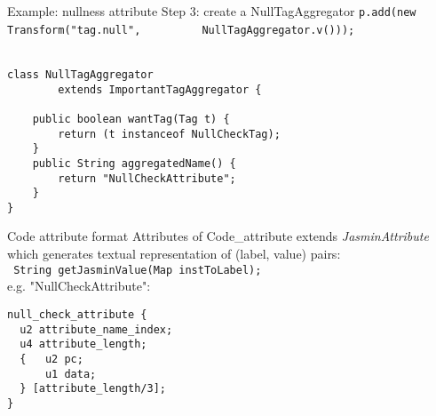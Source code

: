 \begin{slide}{Example: nullness attribute}
Step 3: create a NullTagAggregator
{\scriptsize\verb$p.add(new Transform("tag.null",$
   \verb$         NullTagAggregator.v())); $}
\ \\
\ \\
{\scriptsize
\begin{verbatim}
class NullTagAggregator
        extends ImportantTagAggregator {

    public boolean wantTag(Tag t) {
        return (t instanceof NullCheckTag);
    }
    public String aggregatedName() {
        return "NullCheckAttribute"; 
    }
}
\end{verbatim}
}
\end{slide}

\begin{slide}{Code attribute format}
Attributes of Code\_attribute extends {\em JasminAttribute}
which generates textual representation of (label, value)
pairs:\\
\footnotesize{\verb$ String getJasminValue(Map instToLabel); $} \\
e.g. "NullCheckAttribute":
\footnotesize{
\begin{verbatim}
null_check_attribute {
  u2 attribute_name_index;
  u4 attribute_length;
  {   u2 pc;
      u1 data;
  } [attribute_length/3];
}
\end{verbatim}
}
\end{slide}
